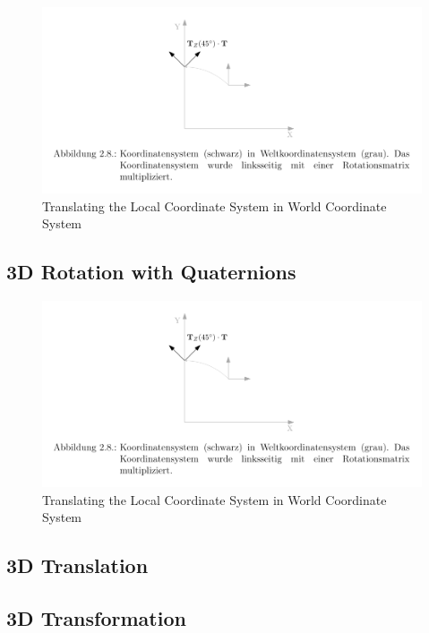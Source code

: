 \documentclass[a4paper]{report}
\numberwithin{figure}{section}
\begin{document}
\begin{figure}[H]
	\centering
	\includegraphics[width=\linewidth,natwidth=640,natheight=640]
	{fig/ref_imgs/2d_translation.png}
  \caption{Translating the Local Coordinate System in World Coordinate System}
	\label{fig:2d_rotation}
\end{figure}




\subsection{3D Rotation with Quaternions}


\begin{figure}[H]
	\centering
	\includegraphics[width=\linewidth,natwidth=640,natheight=640]
	{fig/ref_imgs/2d_translation.png}
  \caption{Translating the Local Coordinate System in World Coordinate System}
	\label{fig:2d_rotation}
\end{figure}



\subsection{3D Translation}


\subsection{3D Transformation}
\end{document}
